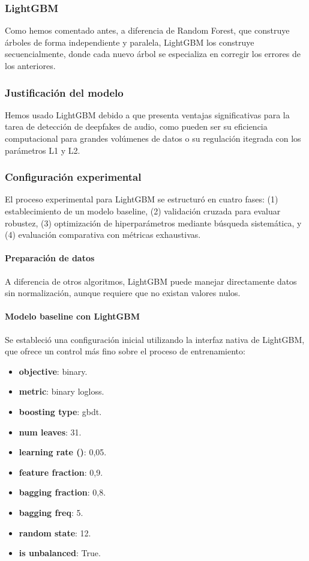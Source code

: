 \subsubsection{LightGBM}

Como hemos comentado antes, a diferencia de Random Forest, que construye árboles de forma independiente y paralela, LightGBM los construye secuencialmente, donde cada nuevo árbol se especializa en corregir los errores de los anteriores.

\subsubsection*{Justificación del modelo}

Hemos usado LightGBM debido a que presenta ventajas significativas para la tarea de detección de deepfakes de audio, como pueden ser su eficiencia computacional para grandes volúmenes de datos o su regulación itegrada con los parámetros L1 y L2.

\subsubsection*{Configuración experimental}

El proceso experimental para LightGBM se estructuró en cuatro fases: (1) establecimiento de un modelo baseline, (2) validación cruzada para evaluar robustez, (3) optimización de hiperparámetros mediante búsqueda sistemática, y (4) evaluación comparativa con métricas exhaustivas.

\paragraph{Preparación de datos}
A diferencia de otros algoritmos, LightGBM puede manejar directamente datos sin normalización, aunque requiere que no existan valores nulos.

\paragraph{Modelo baseline con LightGBM}
Se estableció una configuración inicial utilizando la interfaz nativa de LightGBM, que ofrece un control más fino sobre el proceso de entrenamiento:

\begin{itemize}
	\item \textbf{objective}: binary.
	\item \textbf{metric}: binary logloss.
	\item \textbf{boosting type}: gbdt.
	\item \textbf{num leaves}: 31.
	\item \textbf{learning rate (\eta)}: 0,05.
	\item \textbf{feature fraction}: 0,9.
	\item \textbf{bagging fraction}: 0,8.
	\item \textbf{bagging freq}: 5.
	\item \textbf{random state}: 12.
	\item \textbf{is unbalanced}: True.
\end{itemize}


